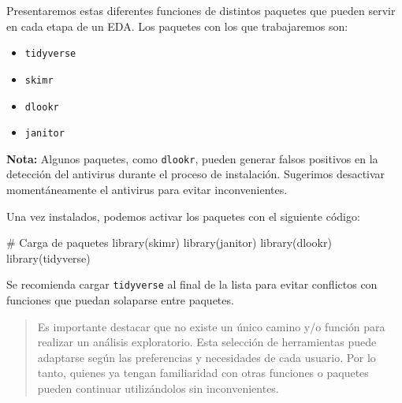 \documentclass[
  spanish,
  a4paper,
]{scrbook}
\newenvironment{Shaded}{\begin{snugshade}}{\end{snugshade}}
\newcommand{\CommentTok}[1]{\textcolor[rgb]{0.37,0.37,0.37}{#1}}
\newcommand{\FunctionTok}[1]{\textcolor[rgb]{0.28,0.35,0.67}{#1}}
\newcommand{\NormalTok}[1]{\textcolor[rgb]{0.00,0.23,0.31}{#1}}
\providecommand{\tightlist}{%
  \setlength{\itemsep}{0pt}\setlength{\parskip}{0pt}}
\begin{document}
Presentaremos estas diferentes funciones de distintos paquetes que
pueden servir en cada etapa de un EDA. Los paquetes con los que
trabajaremos son:

\begin{itemize}
\tightlist
\item
  \texttt{tidyverse}
\item
  \texttt{skimr}
\item
  \texttt{dlookr}
\item
  \texttt{janitor}
\end{itemize}

\begin{tcolorbox}[enhanced jigsaw, arc=.35mm, bottomrule=.15mm, breakable, colback=white, colframe=quarto-callout-warning-color-frame, left=2mm, leftrule=.75mm, opacityback=0, rightrule=.15mm, toprule=.15mm]
\begin{minipage}[t]{5.5mm}
\textcolor{quarto-callout-warning-color}{\faExclamationTriangle}
\end{minipage}%
\begin{minipage}[t]{\textwidth - 5.5mm}

\textbf{Nota:} Algunos paquetes, como \texttt{dlookr}, pueden generar
falsos positivos en la detección del antivirus durante el proceso de
instalación. Sugerimos desactivar momentáneamente el antivirus para
evitar inconvenientes.

\end{minipage}%
\end{tcolorbox}

Una vez instalados, podemos activar los paquetes con el siguiente
código:

\begin{Shaded}
\begin{Highlighting}[]
\CommentTok{\# Carga de paquetes}
\FunctionTok{library}\NormalTok{(skimr)}
\FunctionTok{library}\NormalTok{(janitor)}
\FunctionTok{library}\NormalTok{(dlookr)}
\FunctionTok{library}\NormalTok{(tidyverse)}
\end{Highlighting}
\end{Shaded}

Se recomienda cargar \texttt{tidyverse} al final de la lista para evitar
conflictos con funciones que puedan solaparse entre paquetes.

\begin{quote}
Es importante destacar que no existe un único camino y/o función para
realizar un análisis exploratorio. Esta selección de herramientas puede
adaptarse según las preferencias y necesidades de cada usuario. Por lo
tanto, quienes ya tengan familiaridad con otras funciones o paquetes
pueden continuar utilizándolos sin inconvenientes.
\end{quote}
\end{document}
